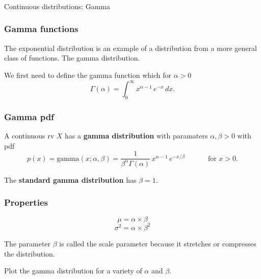 \begin{frame}[fragile]\frametitle{}
\begin{center}
{\Large Continuous distributions: Gamma }

\end{center}
\end{frame}




\begin{frame}[fragile]\frametitle{Gamma functions}

The exponential distribution is an example of a distribution
from a more general class of functions. The gamma distribution. 


\vspace{.1in}

We first need to define the gamma function which for $\alpha>0$
$$\Gamma(\alpha) = \int_0^{\infty} x^{\alpha-1} \, e^{-x} \,dx.$$
\end{frame}


\begin{frame}[fragile]\frametitle{Gamma pdf}

\begin{defn}
A continuous rv $X$ has a {\bf gamma distribution}
with paramaters $\alpha,\beta> 0$ with pdf
$$p(x) = \mbox{gamma}(x;\alpha,\beta) = \frac{1}{\beta^{\alpha}
  \Gamma(\alpha)} \, x^{\alpha-1}\, e^{- x/\beta} \,\,
\,\,\,\,\,\,\,\,\,\,\,\, \,\,\ \mbox{ for } x > 0.$$   


\vspace{.1in}
The  {\bf standard gamma distribution} has $\beta =1$.

\end{defn} 
\end{frame}


\begin{frame}[fragile]\frametitle{Properties}

$$\mu = \alpha \times \beta$$ 
$$\sigma^2 = \alpha \times \beta^2$$ 

\vspace{.1in}

The parameter $\beta$ is called the scale
parameter because it stretches or compresses
the distribution. 

\vspace{.1in}

Plot the gamma distribution for a variety of $\alpha$ and
$\beta$.
\end{frame}

